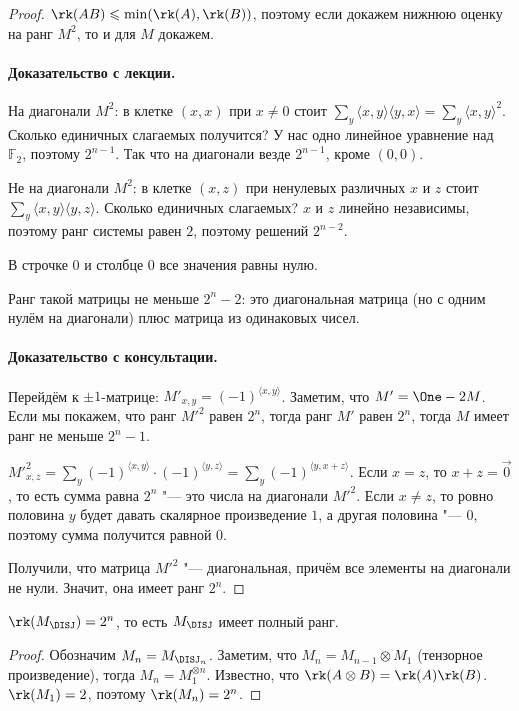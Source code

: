 \begin{proof}
$\rk(AB)\leqslant \min(\rk(A), \rk(B))$, поэтому если докажем нижнюю оценку на ранг $M^2$, то и для $M$ докажем.

\paragraph{Доказательство с лекции.}
На диагонали $M^2$: в клетке $(x, x)$ при $x\neq 0$ стоит $\sum_y\langle x, y\rangle \langle y, x\rangle = \sum_y \langle x, y\rangle^2$. Сколько единичных слагаемых получится? У нас одно линейное уравнение над $\mathbb{F}_2$, поэтому $2^{n-1}$. Так что на диагонали везде $2^{n-1}$, кроме $(0, 0)$.

Не на диагонали $M^2$: в клетке $(x, z)$ при ненулевых различных $x$ и $z$ стоит $\sum_y\langle x, y\rangle \langle y, z\rangle$. Сколько единичных слагаемых? $x$ и $z$ линейно независимы, поэтому ранг системы равен $2$, поэтому решений $2^{n-2}$.

В строчке $0$ и столбце $0$ все значения равны нулю.

Ранг такой матрицы не меньше $2^n - 2$: это диагональная матрица (но с одним нулём на диагонали) плюс матрица из одинаковых чисел.

\paragraph{Доказательство с консультации.}
Перейдём к $\pm 1$-матрице: $M'_{x,y} = (-1)^{\langle x, y\rangle}$. Заметим, что $M' = \One - 2M$. Если мы покажем, что ранг $M'^2$ равен $2^n$, тогда ранг $M'$ равен $2^n$, тогда $M$ имеет ранг не меньше $2^n - 1$.

$M'^2_{x, z} = \sum_y (-1)^{\langle x, y\rangle}\cdot (-1)^{\langle y, z\rangle} = \sum_y (-1)^{\langle y, x + z\rangle}$. Если $x = z$, то $x + z = \vec 0$, то есть сумма равна $2^n$ "--- это числа на диагонали $M'^2$. Если $x\neq z$, то ровно половина $y$ будет давать скалярное произведение $1$, а другая половина "--- $0$, поэтому сумма получится равной $0$.

Получили, что матрица $M'^2$ "--- диагональная, причём все элементы на диагонали не нули. Значит, она имеет ранг $2^n$.
\end{proof}

\begin{theorem}
$\rk(M_{\DISJ}) = 2^n$, то есть $M_{\DISJ}$ имеет полный ранг.
\end{theorem}
\begin{proof}
Обозначим $M_n = M_{\DISJ_n}$. Заметим, что $M_n = M_{n-1} \otimes M_1$ (тензорное произведение), тогда $M_n = M^{\otimes n}_1$. Известно, что $\rk(A\otimes B) = \rk(A)\rk(B)$. $\rk(M_1) = 2$, поэтому $\rk(M_n) = 2^n$.
\end{proof}

